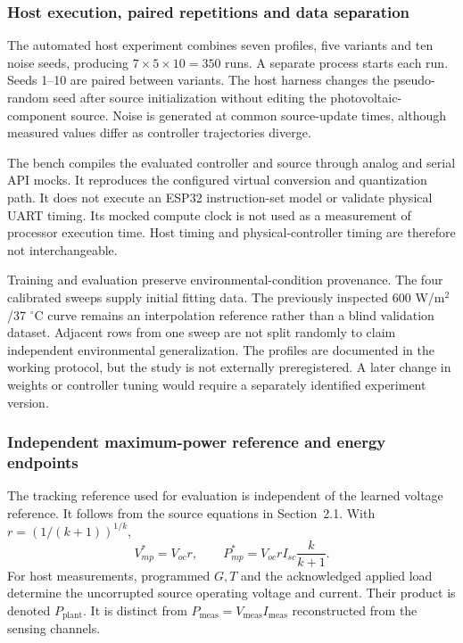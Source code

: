 \documentclass[Acad.Energy.,researcharticle,9pt,twoside,oneauthor]{Definitions/jams_academia}
\begin{document}
\subsubsection{Host execution, paired repetitions and data separation}
The automated host experiment combines seven profiles, five variants and ten noise seeds, producing $7\times5\times10=350$ runs. A separate process starts each run. Seeds 1--10 are paired between variants. The host harness changes the pseudo-random seed after source initialization without editing the photovoltaic-component source. Noise is generated at common source-update times, although measured values differ as controller trajectories diverge.

The bench compiles the evaluated controller and source through analog and serial API mocks. It reproduces the configured virtual conversion and quantization path. It does not execute an ESP32 instruction-set model or validate physical UART timing. Its mocked compute clock is not used as a measurement of processor execution time. Host timing and physical-controller timing are therefore not interchangeable.

Training and evaluation preserve environmental-condition provenance. The four calibrated sweeps supply initial fitting data. The previously inspected 600 W/m$^2$/37 $^\circ$C curve remains an interpolation reference rather than a blind validation dataset. Adjacent rows from one sweep are not split randomly to claim independent environmental generalization. The profiles are documented in the working protocol, but the study is not externally preregistered. A later change in weights or controller tuning would require a separately identified experiment version.

\subsubsection{Independent maximum-power reference and energy endpoints}
The tracking reference used for evaluation is independent of the learned voltage reference. It follows from the source equations in Section~2.1. With $r=(1/(k+1))^{1/k}$,
\begin{equation}
 V_{mp}^{*}=V_{oc}r,\qquad
 P_{mp}^{*}=V_{oc}rI_{sc}\frac{k}{k+1}.
 \label{eq:independentmpp}
\end{equation}
For host measurements, programmed $G,T$ and the acknowledged applied load determine the uncorrupted source operating voltage and current. Their product is denoted $P_{\mathrm{plant}}$. It is distinct from $P_{\mathrm{meas}}=V_{\mathrm{meas}}I_{\mathrm{meas}}$ reconstructed from the sensing channels.
\end{document}
